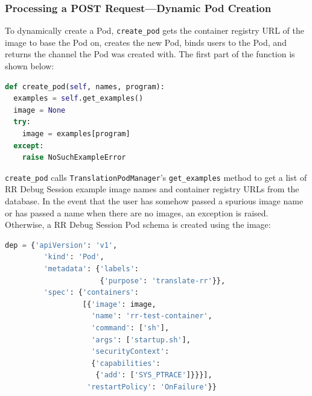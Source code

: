 \documentclass[12pt]{article}
\begin{document}




\subsubsection{Processing a POST Request---Dynamic Pod Creation}

To dynamically create a Pod, \lstinline{create_pod} gets the container
registry URL of the image to base the Pod on, creates the new Pod,
binds users to the Pod, and returns the channel the Pod was created
with.  The first part of the function is shown below:

\begin{lstlisting}[language=Python,basicstyle=\linespread{0.5}\ttfamily,caption={Pod Creation 1},captionpos=b]
def create_pod(self, names, program):
  examples = self.get_examples()
  image = None
  try:
    image = examples[program]
  except:
    raise NoSuchExampleError
\end{lstlisting}

\lstinline{create_pod} calls \lstinline{TranslationPodManager}'s
\lstinline{get_examples} method to get a list of RR Debug Session
example image names and container registry URLs from the database.  In
the event that the user has somehow passed a spurious image name or has
passed a name when there are no images, an exception is raised.
Otherwise, a RR Debug Session Pod schema is created using the image:


\begin{lstlisting}[language=Python,basicstyle=\linespread{0.5}\ttfamily,caption={Pod Creation 2},captionpos=b]
  dep = {'apiVersion': 'v1',
         'kind': 'Pod',
         'metadata': {'labels':
                      {'purpose': 'translate-rr'}},
         'spec': {'containers':
                  [{'image': image,
                    'name': 'rr-test-container',
                    'command': ['sh'],
                    'args': ['startup.sh'],
                    'securityContext':
                    {'capabilities':
                     {'add': ['SYS_PTRACE']}}}],
                   'restartPolicy': 'OnFailure'}}
\end{lstlisting}
\end{document}
